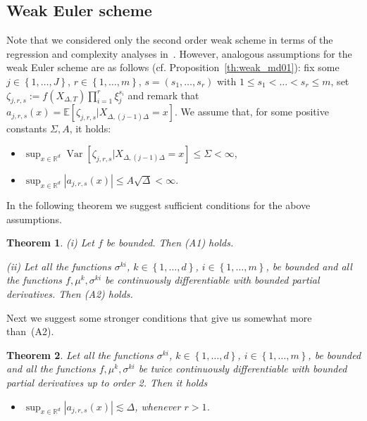 \documentclass[11pt,a4paper]{amsart}
\theoremstyle{plain}
\newtheorem{theorem}{Theorem}[section]
\theoremstyle{definition}
\theoremstyle{remark}
\numberwithin{equation}{section}
\newcommand*{\R}{\mathbb{R}}
\newcommand*{\Var}{\operatorname{Var}}
\newcommand*{\EE}{\mathbb E}
\newcommand*{\cK}{\mathcal K}
\renewcommand*{\doteq}{:=}
\begin{document}
\subsection{Weak Euler scheme}
\label{sec:trunc_first}
Note that we considered only the second order weak scheme in terms of the regression and complexity analyses in~\cite{belomestny2016variance}. However, analogous assumptions for the weak Euler scheme are as follows (cf. Proposition~\ref{th:weak_md01}): fix some $j\in\left\{1,\ldots, J\right\}$, $r\in\left\{1,\ldots,m\right\}$, $s=(s_1,\ldots,s_r)$ with $1\le s_1<\ldots<s_r\le m$, set $\zeta_{j,r,s}\doteq f(X_{\Delta,T})\prod_{i=1}^r \xi_j^{s_i}$
and remark that
$a_{j,r,s}(x)=\EE[\zeta_{j,r,s}|X_{\Delta, (j-1)\Delta}=x
]$. We assume that, for some positive
constants $\Sigma,A$, it holds:
\begin{itemize}
\item[(A1)]
$\sup_{x\in\R^d}\Var[\zeta_{j,r,s}|X_{\Delta,(j-1)\Delta}=x]
\le\Sigma<\infty$,
\item[(A2)]
$\sup_{x\in\R^d} |a_{j,r,s}(x)|\le A\sqrt{\Delta}<\infty$.
\end{itemize}
In the following theorem we suggest sufficient conditions
for the above assumptions.

\begin{theorem}
\label{th:first_old}
(i)
Let $f$ be bounded. Then (A1) holds.

(ii) Let all the functions $\sigma^{ki}$, $k\in\left\{1,\ldots,d\right\}$, $i\in\left\{1,\ldots,m\right\}$, be bounded and all the functions $f,\mu^k,\sigma^{ki}$ be continuously differentiable with bounded partial derivatives. Then (A2) holds.
\end{theorem}

Next we suggest some stronger conditions
that give us somewhat more than~(A2).

\begin{theorem}
\label{th:first_new}
Let all the functions $\sigma^{ki}$, $k\in\left\{1,\ldots,d\right\}$, $i\in\left\{1,\ldots,m\right\}$, be bounded and all the functions $f,\mu^k,\sigma^{ki}$ be twice continuously differentiable with bounded partial derivatives up to order 2. Then it holds
\begin{itemize}
\item[(A3)] $\sup_{x\in\R^d} |a_{j,r,s}(x)|\lesssim\Delta$,
whenever $r>1$.
\end{itemize}
\end{theorem}
\end{document}
